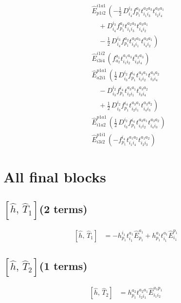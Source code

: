 \documentclass[11pt]{article}
\begin{document}
\begin{align}
&\hat{E}^{i1a1}_{p1i2}\,\left(- \tfrac{1}{2}\, D^{i_{3}}_{i_{4}} f^{a_{2}}_{p_{1}} t^{a_{2}a_{3}}_{i_{1}i_{3}} t^{a_{3}a_{1}}_{i_{2}i_{4}} \right. \\
&\left.\quad + D^{i_{3}}_{i_{4}} f^{a_{2}}_{p_{1}} t^{a_{2}a_{3}}_{i_{1}i_{3}} t^{a_{3}a_{1}}_{i_{4}i_{2}} \right. \\
&\left.\quad - \tfrac{1}{2}\, D^{i_{3}}_{i_{4}} f^{a_{2}}_{p_{1}} t^{a_{2}a_{3}}_{i_{3}i_{1}} t^{a_{3}a_{1}}_{i_{4}i_{2}} \right) \\
&\hat{E}^{i1i2}_{i3i4}\,\left(f^{a_{1}}_{a_{2}} t^{a_{1}a_{3}}_{i_{1}i_{2}} t^{a_{2}a_{3}}_{i_{3}i_{4}} \right) \\
&\hat{E}^{p1a1}_{a2i1}\,\left(\tfrac{1}{2}\, D^{i_{2}}_{i_{3}} f^{i_{4}}_{p_{1}} t^{a_{3}a_{1}}_{i_{1}i_{2}} t^{a_{3}a_{2}}_{i_{3}i_{4}} \right. \\
&\left.\quad - D^{i_{2}}_{i_{3}} f^{i_{4}}_{p_{1}} t^{a_{3}a_{1}}_{i_{2}i_{1}} t^{a_{3}a_{2}}_{i_{3}i_{4}} \right. \\
&\left.\quad + \tfrac{1}{2}\, D^{i_{2}}_{i_{3}} f^{i_{4}}_{p_{1}} t^{a_{3}a_{1}}_{i_{2}i_{1}} t^{a_{3}a_{2}}_{i_{4}i_{3}} \right) \\
&\hat{E}^{p1a1}_{i1a2}\,\left(\tfrac{1}{2}\, D^{i_{2}}_{i_{3}} f^{i_{4}}_{p_{1}} t^{a_{3}a_{1}}_{i_{1}i_{2}} t^{a_{3}a_{2}}_{i_{4}i_{3}} \right) \\
&\hat{E}^{p1i1}_{i3i2}\,\left(- f^{i_{4}}_{p_{1}} t^{a_{1}a_{2}}_{i_{1}i_{4}} t^{a_{1}a_{2}}_{i_{2}i_{3}} \right)
\end{align}

\section{All final blocks}
\subsection*{$\left[\hat{h},\, \hat{T}_{1}\right]$\quad(2 terms)}
\begin{align}
\left[\hat{h},\, \hat{T}_{1}\right] &= - h^{i_{1}}_{p_{1}} t^{a_{1}}_{i_{1}} \hat{E}^{a_{1}}_{p_{1}} + h^{a_{1}}_{p_{1}} t^{a_{1}}_{i_{1}} \hat{E}^{p_{1}}_{i_{1}}
\end{align}
\subsection*{$\left[\hat{h},\, \hat{T}_{2}\right]$\quad(1 terms)}
\begin{align}
\left[\hat{h},\, \hat{T}_{2}\right] &= h^{a_{2}}_{p_{1}} t^{a_{2}a_{1}}_{i_{2}i_{1}} \hat{E}^{a_{1}p_{1}}_{i_{1}i_{2}}
\end{align}
\end{document}
